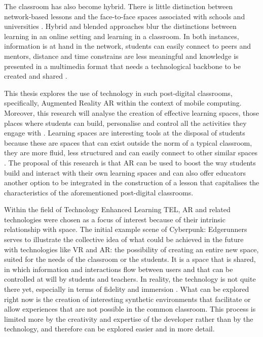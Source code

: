 The classroom has also become hybrid. There is little distinction between network-based lessons and the face-to-face spaces
associated with schools and universities \parencite{goodyear_2004}. Hybrid and blended approaches blur the distinctions
between learning in an online setting and learning in a classroom. In both instances, information is at hand in the network,
students can easily connect to peers and mentors, distance and time constrains are less meaningful and knowledge is presented
in a multimedia format that needs a technological backbone to be created and shared \parencite{rivoltella_2008,shank_2005}.

This thesis explores the use of technology in such post-digital classrooms, specifically, Augmented Reality \ac{AR} within the
context of mobile computing. Moreover, this research will analyse the creation of effective learning spaces, those places where
students can build, personalise and control all the activities they engage with \parencite{gourlay_2016}. Learning spaces are
interesting tools at the disposal of students because these are spaces that can exist outside the norm of a typical classroom,
they are more fluid, less structured and can easily connect to other similar spaces \parencite{norgard_2022}. The proposal of
this research is that \ac{AR} can be used to boost the way students build and interact with their own learning spaces and can also
offer educators another option to be integrated in the construction of a lesson that capitalises the characteristics of the
aforementioned post-digital classrooms.

Within the field of Technology Enhanced Learning \ac{TEL}, \ac{AR} and related technologies were chosen as a focus of interest
because of their intrinsic relationship with space. The initial example scene of Cyberpunk: Edgerunners serves to illustrate the
collective idea of what could be achieved in the future with technologies like \ac{VR} and \ac{AR}: the possibility of creating an
entire new space, suited for the needs of the classroom or the students. It is a space that is shared, in which information and
interactions flow between users and that can be controlled at will by students and teachers. In reality, the technology is not quite
there yet, especially in terms of fidelity and immersion \parencite{hamad_2022,checa_2020}. What can be explored right now is the
creation of interesting synthetic environments that facilitate or allow experiences that are not possible in the common classroom.
This process is limited more by the creativity and expertise of the developer rather than by the technology, and therefore can be
explored easier and in more detail.


